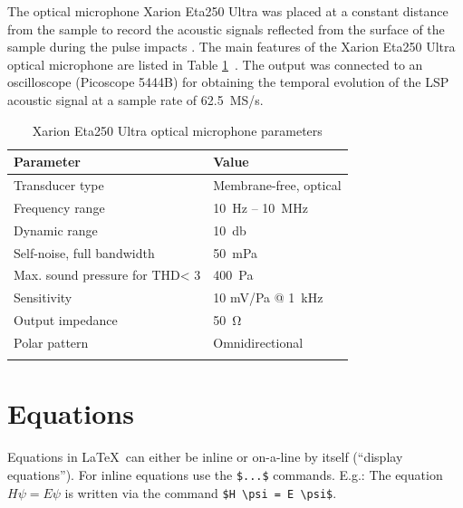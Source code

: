 \documentclass[sn-nature]{sn-jnl}%
\theoremstyle{thmstyleone}%
\theoremstyle{thmstyletwo}%
\theoremstyle{thmstylethree}%
\begin{document}
    The optical microphone Xarion Eta250 Ultra was placed at a constant distance from the sample to record the acoustic signals reflected from the surface of the sample during the pulse impacts \cite{banerjee_2019}. The main features of the Xarion Eta250 Ultra optical microphone are listed in Table \ref{tab:xarionparameters}~\cite{xarion_eta}. The output was connected to an oscilloscope (Picoscope 5444B) for obtaining the temporal evolution of the LSP acoustic signal at a sample rate of \SI[]{62.5}{\mega\siemens/\s}.


    \begin{table}[h!]
    \caption{Xarion Eta250 Ultra optical microphone parameters \cite{xarion_eta}}\label{tab:xarionparameters}%
    \begin{tabular}{@{}ll@{}}
    \toprule    
    Parameter & Value  \\
    \midrule

    Transducer type & Membrane-free, optical  \\
    Frequency range &  \SI{10}{\hertz} -- \SI{10}{\mega\hertz} \\
    Dynamic range & \SI{10}{\decibel}  \\
    Self-noise, full bandwidth & \SI{50}{\milli\pascal}  \\ 
    Max. sound pressure for THD\footnotemark[1]  < 3 & \SI{400}{\pascal}  \\
    Sensitivity & 10 mV/Pa @ \SI{1}{\kilo\hertz}  \\
    Output impedance & \SI{50}{\ohm}   \\
    Polar pattern & Omnidirectional  \\
    \botrule
    \end{tabular}
    \end{table}





\section{Equations}\label{sec4}

Equations in \LaTeX\ can either be inline or on-a-line by itself (``display equations''). For
inline equations use the \verb+$...$+ commands. E.g.: The equation
$H\psi = E \psi$ is written via the command \verb+$H \psi = E \psi$+.
\end{document}
